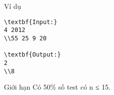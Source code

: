 Ví dụ
\begin{verbatim}
\textbf{Input:}
4 2012
\\55 25 9 20

\textbf{Output:}
2
\\8\end{verbatim}
Giới hạn
Có 50\% số test có n ≤ 15.